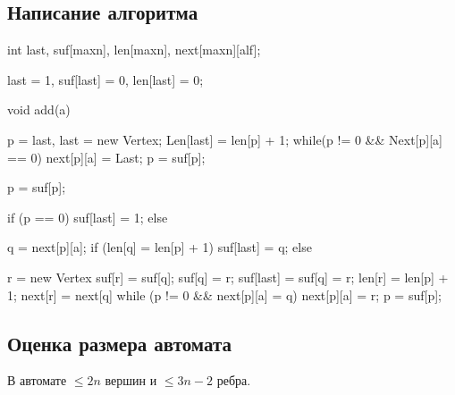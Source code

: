 \subsection{Написание алгоритма}
\begin{cppcode}
int last, suf[maxn], len[maxn], next[maxn][alf];

last = 1, 
suf[last] = 0, 
len[last] = 0;

void add(a) {
    p = last, last = new Vertex;
    Len[last] = len[p] + 1;
    while(p != 0 && Next[p][a] == 0) {
        next[p][a] = Last;
        p = suf[p];
    }
    
    p = suf[p];
    
    if (p == 0) {
        suf[last] = 1;
    } else {
        q = next[p][a];
        if (len[q] = len[p] + 1) {
            suf[last] = q;
        } else {
            r = new Vertex
            suf[r] = suf[q];
            suf[q] = r;
            suf[last] = suf[q] = r;
            len[r] = len[p] + 1;
            next[r] = next[q]
            while (p != 0 && next[p][a] = q)  {
                next[p][a] = r;
                p = suf[p];
            }

        }
    }
}

\end{cppcode}
\subsection{Оценка размера автомата}
\begin{theorem}
В автомате $\le 2n$ вершин и $\le 3n - 2$ ребра. 
\end{theorem}

